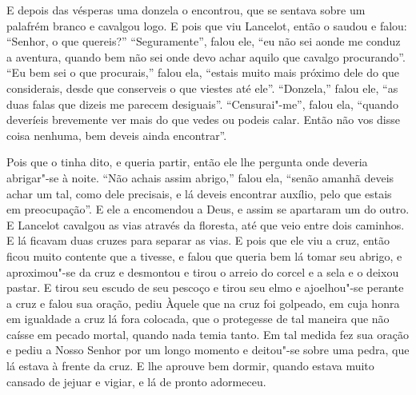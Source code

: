 E depois das vésperas uma donzela o encontrou, que se sentava sobre um
palafrém branco e cavalgou logo. E pois que viu Lancelot, então o saudou e
falou: “Senhor, o que quereis?” “Seguramente”, falou ele, “eu não sei aonde me
conduz a aventura, quando bem não sei onde devo achar aquilo que cavalgo
procurando”. “Eu bem sei o que procurais,” falou ela, “estais muito mais
próximo dele do que considerais, desde que conserveis o que viestes até ele”.
“Donzela,” falou ele, “as duas falas que dizeis me parecem desiguais”.
“Censurai"-me”, falou ela, “quando deveríeis brevemente ver mais do que vedes ou
podeis calar. Então não vos disse coisa nenhuma, bem deveis ainda encontrar”.

Pois que o tinha dito, e queria partir, então ele lhe pergunta onde deveria
abrigar"-se à noite. “Não achais assim abrigo,” falou ela, “senão amanhã deveis
achar um tal, como dele precisais, e lá deveis encontrar auxílio, pelo que
estais em preocupação”. E ele a encomendou a Deus, e assim se apartaram um do
outro. E Lancelot cavalgou as vias através da floresta, até que veio entre
dois caminhos. E lá ficavam duas cruzes para separar as vias. E pois que ele
viu a cruz, então ficou muito contente que a tivesse, e falou que queria bem lá
tomar seu abrigo, e aproximou"-se da cruz e desmontou e tirou o arreio do corcel
e a sela e o deixou pastar. E tirou seu escudo de seu pescoço e tirou seu elmo
e ajoelhou"-se perante a cruz e falou sua oração, pediu Àquele que na cruz foi
golpeado, em cuja honra em igualdade a cruz lá fora colocada, que o protegesse
de tal maneira que não caísse em pecado mortal, quando nada temia tanto. Em tal
medida fez sua oração e pediu a Nosso Senhor por um longo momento e deitou"-se
sobre uma pedra, que lá estava à frente da cruz. E lhe aprouve bem dormir,
quando estava muito cansado de jejuar e vigiar, e lá de pronto adormeceu.


